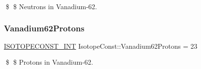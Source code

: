 \$ \$ Neutrons in Vanadium-\/62. \mbox{\label{group___isotope_const-_vanadium-_v62_gae8f27ae23c41f646b58f0be22fbe4b55}} 
\subsubsection{\texorpdfstring{Vanadium62\+Protons}{Vanadium62Protons}}
{\footnotesize\ttfamily \mbox{\hyperlink{group___isotope_const-_macros_ga5f18360b3e99483a35c32d789e62621c}{I\+S\+O\+T\+O\+P\+E\+C\+O\+N\+S\+T\+\_\+\+I\+NT}} Isotope\+Const\+::\+Vanadium62\+Protons = 23}

\$ \$ Protons in Vanadium-\/62. 